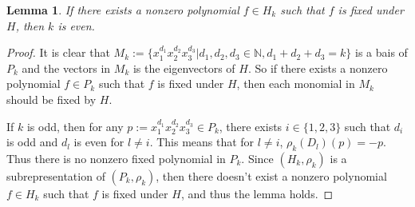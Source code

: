 \documentclass[a4paper]{amsart}
\theoremstyle{plain}
\newtheorem{lem}[thm]{Lemma}
\theoremstyle{remark} \newtheorem{remark}[thm]{Remark}
\theoremstyle{remark} \newtheorem{exercise}{Exercise}
\theoremstyle{remark} \newtheorem{example}{Example}
\numberwithin{equation}{section}
\begin{document}
\begin{lem}\label{fixed point of harmonic polynomials}
    If there exists a nonzero polynomial $f\in H_k$ such that $f$ is fixed under $H$, then $k$ is even.
\end{lem}
\begin{proof}
    It is clear that $M_k:=\{x_1^{d_1}x_2^{d_2}x_{3}^{d_3}|d_1,d_2,d_3\in\mathbb{N},d_1+d_2+d_3=k\}$ is a bais of $P_k$ and the vectors in $M_k$ is the eigenvectors of $H$.  So if there exists a nonzero polynomial $f\in P_k$ such that $f$ is fixed under $H$, then each monomial in $M_k$ should be fixed by $H$.
    
    If $k$ is odd, then for any $p:=x_1^{d_1}x_2^{d_2}x_{3}^{d_3}\in P_k$, there exists $i\in\{1,2,3\}$ such that $d_i$ is odd and $d_l$ is even for $l\neq i$. This means that for $l\neq i$, $\rho_k(D_l)(p)=-p$. Thus there is no nonzero fixed polynomial in $P_k$. Since $(H_k,\rho_k)$ is a subrepresentation of $(P_k,\rho_k)$, then there doesn't exist a nonzero polynomial $f\in H_k$ such that $f$ is fixed under $H$, and thus the lemma holds.
\end{proof}
\end{document}
